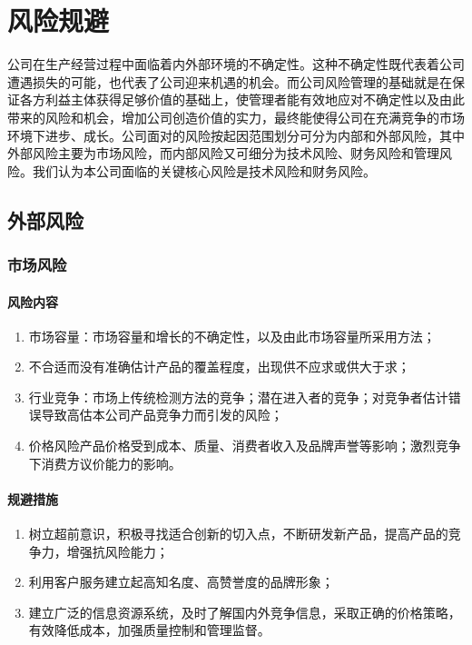 \documentclass[violet]{main}
\begin{document}
		\section{风险规避}
			公司在生产经营过程中面临着内外部环境的不确定性。这种不确定性既代表着公司遭遇损失的可能，也代表了公司迎来机遇的机会。而公司风险管理的基础就是在保证各方利益主体获得足够价值的基础上，使管理者能有效地应对不确定性以及由此带来的风险和机会，增加公司创造价值的实力，最终能使得公司在充满竞争的市场环境下进步、成长。公司面对的风险按起因范围划分可分为内部和外部风险，其中外部风险主要为市场风险，而内部风险又可细分为技术风险、财务风险和管理风险。我们认为本公司面临的关键核心风险是技术风险和财务风险。
			\subsection{外部风险}
				\subsubsection{市场风险}
					\paragraph{风险内容}
						\begin{enumerate}
							\item 市场容量：市场容量和增长的不确定性，以及由此市场容量所采用方法；
							\item 不合适而没有准确估计产品的覆盖程度，出现供不应求或供大于求；
							\item 行业竞争：市场上传统检测方法的竞争；潜在进入者的竞争；对竞争者估计错误导致高估本公司产品竞争力而引发的风险；
							\item 价格风险产品价格受到成本、质量、消费者收入及品牌声誉等影响；激烈竞争下消费方议价能力的影响。
						\end{enumerate}
					\paragraph{规避措施}
						\begin{enumerate}
							\item 树立超前意识，积极寻找适合创新的切入点，不断研发新产品，提高产品的竞争力，增强抗风险能力；
							\item 利用客户服务建立起高知名度、高赞誉度的品牌形象；
							\item 建立广泛的信息资源系统，及时了解国内外竞争信息，采取正确的价格策略，有效降低成本，加强质量控制和管理监督。
						\end{enumerate}
\end{document}
